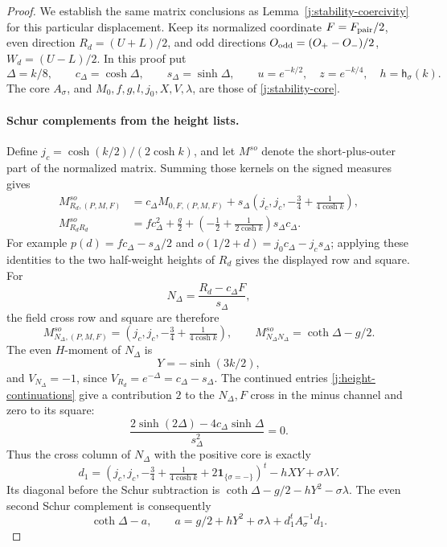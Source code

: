 \begin{proof}
We establish the same matrix conclusions as Lemma~\ref{j:stability-coercivity} for this particular displacement. Keep its normalized coordinate \(F=F_{\rm pair}/2\), even direction \(R_d=(U+L)/2\), and odd directions \(O_{\rm odd}=(O_+-O_-)/2\), \(W_d=(U-L)/2\). In this proof put
\[
\Delta=k/8,\qquad c_\Delta=\cosh\Delta,\qquad s_\Delta=\sinh\Delta,
\qquad u=e^{-k/2},\quad z=e^{-k/4},\quad h=\mathsf h_\sigma(k).
\]
The core \(A_\sigma\), and \(M_0,f,g,l,j_0,X,V,\lambda\), are those of \eqref{j:stability-core}.

\paragraph{Schur complements from the height lists.}
Define \(j_c=\cosh(k/2)/(2\cosh k)\), and let \(M^{so}\) denote the short-plus-outer part of the normalized matrix. Summing those kernels on the signed measures gives
\[
\begin{aligned}
M^{so}_{R_d,(P,M,F)}
&=c_\Delta M_{0,F,(P,M,F)}
+s_\Delta\left(j_c,j_c,-\tfrac34+\tfrac1{4\cosh k}\right),\\
M^{so}_{R_dR_d}
&=f c_\Delta^2+\tfrac g2
+\left(-\tfrac12+\tfrac1{2\cosh k}\right)s_\Delta c_\Delta .
\end{aligned}
\]
For example \(p(d)=f c_\Delta-s_\Delta/2\) and
\(o(1/2+d)=j_0c_\Delta-j_cs_\Delta\); applying these identities to the two half-weight heights of \(R_d\) gives the displayed row and square. For
\[
N_\Delta=\frac{R_d-c_\Delta F}{s_\Delta},
\]
the field cross row and square are therefore
\[
M^{so}_{N_\Delta,(P,M,F)}
=\left(j_c,j_c,-\tfrac34+\tfrac1{4\cosh k}\right),
\qquad
M^{so}_{N_\Delta N_\Delta}=\coth\Delta-g/2.
\]
The even \(H\)-moment of \(N_\Delta\) is
\[
Y=-\sinh(3k/2),
\]
and \(V_{N_\Delta}=-1\), since \(V_{R_d}=e^{-\Delta}=c_\Delta-s_\Delta\). The continued entries \eqref{j:height-continuations} give a contribution \(2\) to the \(N_\Delta,F\) cross in the minus channel and zero to its square:
\[
\frac{2\sinh(2\Delta)-4c_\Delta\sinh\Delta}{s_\Delta^2}=0.
\]
Thus the cross column of \(N_\Delta\) with the positive core is exactly
\[
d_1=
\left(j_c,j_c,-\tfrac34+\tfrac1{4\cosh k}
+2\mathbf1_{\{\sigma=-\}}\right)^t
-hXY+\sigma\lambda V.
\]
Its diagonal before the Schur subtraction is
\(\coth\Delta-g/2-hY^2-\sigma\lambda\). The even second Schur complement is consequently
\begin{equation}\label{j:eighth-even-schur}
\coth\Delta-a,\qquad
a=g/2+hY^2+\sigma\lambda+d_1^tA_\sigma^{-1}d_1.
\end{equation}


\end{proof}
